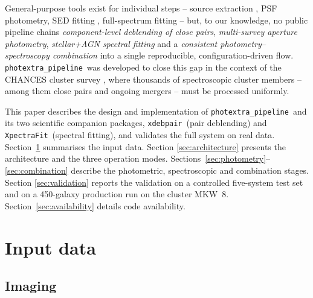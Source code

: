 \documentclass{aa}
\newcommand{\photextra}{\texttt{photextra\_pipeline}}
\newcommand{\xdebpair}{\texttt{xdebpair}}
\newcommand{\xpectrafit}{\texttt{XpectraFit}}
\begin{document}
General-purpose tools exist for individual steps -- source extraction
\citep{bertin1996,barbary2016}, PSF photometry, SED fitting
\citep{boquien2019}, full-spectrum fitting \citep{cappellari2017} -- but,
to our knowledge, no public pipeline chains \emph{component-level
deblending of close pairs}, \emph{multi-survey aperture photometry},
\emph{stellar+AGN spectral fitting} and a \emph{consistent
photometry--spectroscopy combination} into a single reproducible,
configuration-driven flow. \photextra\ was developed to close this gap in
the context of the CHANCES cluster survey \citep{sifon2025}, where
thousands of spectroscopic cluster members -- among them close pairs and
ongoing mergers -- must be processed uniformly.

This paper describes the design and implementation of \photextra\ and its
two scientific companion packages, \xdebpair\ (pair deblending) and
\xpectrafit\ (spectral fitting), and validates the full system on real
data. Section~\ref{sec:data} summarises the input data. Section
\ref{sec:architecture} presents the architecture and the three operation
modes. Sections~\ref{sec:photometry}--\ref{sec:combination} describe the
photometric, spectroscopic and combination stages. Section
\ref{sec:validation} reports the validation on a controlled five-system
test set and on a 450-galaxy production run on the cluster MKW~8.
Section~\ref{sec:availability} details code availability.

\section{Input data}
\label{sec:data}

\subsection{Imaging}
\label{sec:data_imaging}
\end{document}
